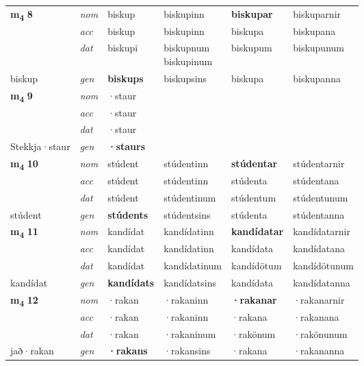 \begin{longtable}[l]{X>{\footnotesize\itshape}XXXXX}
\multirow{3}{*}{{{\textbf{m{\textsubscript{4}}} \Large{\textbf{8}}}}} & nom & biskup & biskupinn & \textbf{biskupar} & biskuparnir \\*
 & acc & biskup & biskupinn & biskupa & biskupana \\*
 & dat & biskupi & \specialcell{biskupnum\\ biskupinum} & biskupum & biskupunum \\*
 {\footnotesize{biskup}} & gen & \textbf{biskups} & biskupsins & biskupa & biskupanna \\
\midrule

\multirow{3}{*}{{{\textbf{m{\textsubscript{4}}} \Large{\textbf{9}}}}} & nom & ·staur &  & \textbf{} &  \\*
 & acc & ·staur &  &  &  \\*
 & dat & ·staur &  &  &  \\*
 {\footnotesize{Stekkja\allowbreak ·staur}} & gen & \textbf{·staurs} &  &  &  \\
\midrule

\multirow{3}{*}{{{\textbf{m{\textsubscript{4}}} \Large{\textbf{10}}}}} & nom & stúdent & stúdentinn & \textbf{stúdentar} & stúdentarnir \\*
 & acc & stúdent & stúdentinn & stúdenta & stúdentana \\*
 & dat & stúdent & stúdentinum & stúdentum & stúdentunum \\*
 {\footnotesize{stúdent}} & gen & \textbf{stúdents} & stúdentsins & stúdenta & stúdentanna \\
\midrule

\multirow{3}{*}{{{\textbf{m{\textsubscript{4}}} \Large{\textbf{11}}}}} & nom & kandídat & kandídatinn & \textbf{kandídatar} & kandídatarnir \\*
 & acc & kandídat & kandídatinn & kandídata & kandídatana \\*
 & dat & kandídat & kandídatinum & kandídötum & kandídötunum \\*
 {\footnotesize{kandídat}} & gen & \textbf{kandídats} & kandídatsins & kandídata & kandídatanna \\
\midrule

\multirow{3}{*}{{{\textbf{m{\textsubscript{4}}} \Large{\textbf{12}}}}} & nom & ·rakan & ·rakaninn & \textbf{·rakanar} & ·rakanarnir \\*
 & acc & ·rakan & ·rakaninn & ·rakana & ·rakanana \\*
 & dat & ·rakan & ·rakaninum & ·rakönum & ·rakönunum \\*
 {\footnotesize{jað\allowbreak ·rakan}} & gen & \textbf{·rakans} & ·rakansins & ·rakana & ·rakananna \\
\midrule


\end{longtable}

